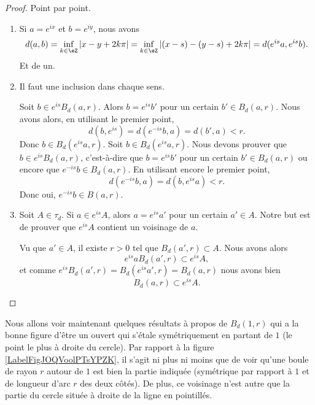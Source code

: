 \begin{proof}
	Point par point.
	\begin{enumerate}
		\item
		      Si \( a= e^{ix}\) et \( b= e^{iy}\), nous avons
		      \begin{equation}
			      d(a,b)=\inf_{k\in \eZ}| x-y+2k\pi |=\inf_{k\in \eZ}| (x-s)-(y-s)+2k\pi |=d( e^{is}a, e^{is}b).
		      \end{equation}
		      Et de un.
		\item
		      Il faut une inclusion dans chaque sens.
		      \begin{subproof}
			      \spitem[\(  e^{is}B_d(a,r)\subset B_d( e^{is}a,r)\)]
			      Soit \( b\in  e^{is}B_d(a,r)\). Alors \( b= e^{is}b'\) pour un certain \( b'\in B_d(a,r)\). Nous avons alors, en utilisant le premier point,
			      \begin{equation}
				      d(b, e^{is})=d( e^{-is}b,a)=d(b',a)<r.
			      \end{equation}
			      Donc \( b\in B_d( e^{is}a,r)\).
			      \spitem[\(  B_d( e^{is}a,r)\subset e^{is} B_d( a,r)\)]
			      Soit \( b\in B_d( e^{is}a,r)\). Nous devons prouver que \( b\in  e^{is}B_d(a,r)\), c'est-à-dire que \( b= e^{is}b'\) pour un certain \( b'\in B_d(a,r)\) ou encore que \(  e^{-is}b\in B_d(a,r)\). En utilisant encore le premier point,
			      \begin{equation}
				      d( e^{-is}b,a)=d(b, e^{is}a)<r.
			      \end{equation}
			      Donc oui, \(  e^{-is}b\in B(a,r)\).
		      \end{subproof}
		\item
		      Soit \( A\in\tau_d\). Si \( a\in  e^{is}A\), alors \( a= e^{is}a'\) pour un certain \( a'\in A\). Notre but est de prouver que \(  e^{is}A\) contient un voisinage de \( a\).

		      Vu que \( a'\in A\), il existe \( r>0\) tel que \( B_d(a',r)\subset A\). Nous avons alors
		      \begin{equation}
			      e^{is}aB_d(a',r)\subset  e^{is}A,
		      \end{equation}
		      et comme \(  e^{is}B_d(a',r)=B_d( e^{is}a',r)=B_d(a,r)\) nous avons bien
		      \begin{equation}
			      B_d(a,r)\subset  e^{is}A.
		      \end{equation}
	\end{enumerate}
\end{proof}

Nous allons voir maintenant quelques résultats à propos de \(B_d(1,r)\) qui a la bonne figure d'être un ouvert qui s'étale symétriquement en partant de \( 1\) (le point le plus à droite du cercle). Par rapport à la figure \ref{LabelFigJOQVoolPTsYPZK}, il s'agit ni plus ni moins que de voir qu'une boule de rayon \( r\) autour de \( 1\) est bien la partie indiquée (symétrique par rapport à \( 1\) et de longueur d'arc \( r\) des deux côtés). De plus, ce voisinage n'est autre que la partie du cercle située à droite de la ligne en pointillés.
\newcommand{\CaptionFigJOQVoolPTsYPZK}{Un voisinage de \( 1\) dans \( S^1\).}


